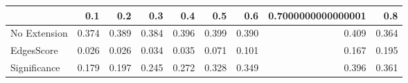 \begin{tabular}{lrrrrrrrr}
\toprule
{} &   0.1 &   0.2 &   0.3 &   0.4 &   0.5 &   0.6 & 0.7000000000000001 &   0.8 \\
\midrule
No Extension & 0.374 & 0.389 & 0.384 & 0.396 & 0.399 & 0.390 &              0.409 & 0.364 \\
EdgesScore   & 0.026 & 0.026 & 0.034 & 0.035 & 0.071 & 0.101 &              0.167 & 0.195 \\
Significance & 0.179 & 0.197 & 0.245 & 0.272 & 0.328 & 0.349 &              0.396 & 0.361 \\
\bottomrule
\end{tabular}
